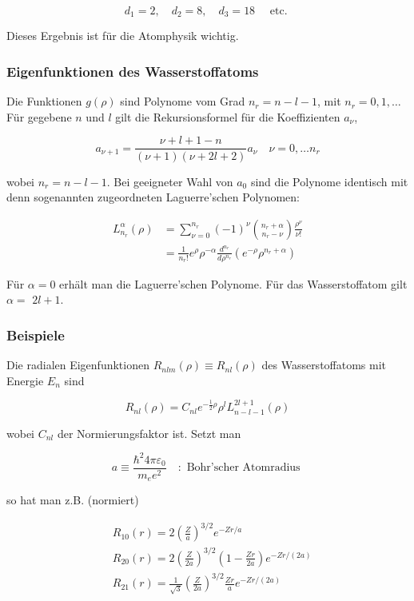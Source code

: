 \documentclass[10pt, letterpaper]{article}
\begin{document}
$$
d_{1}=2, \quad d_{2}=8, \quad d_{3}=18 \quad \text { etc. }
$$

Dieses Ergebnis ist für die Atomphysik wichtig.

\subsubsection*{Eigenfunktionen des Wasserstoffatoms}
Die Funktionen $g(\rho)$ sind Polynome vom Grad $n_{r}=n-l-1$, mit $n_{r}=0,1, \ldots$ Für gegebene $n$ und $l$ gilt die Rekursionsformel für die Koeffizienten $a_{\nu}$,

$$
a_{\nu+1}=\frac{\nu+l+1-n}{(\nu+1)(\nu+2 l+2)} a_{\nu} \quad \nu=0, \ldots n_{r}
$$

wobei $n_{r}=n-l-1$. Bei geeigneter Wahl von $a_{0}$ sind die Polynome identisch mit denn sogenannten zugeordneten Laguerre'schen Polynomen:

$$
\begin{aligned}
L_{n_{r}}^{\alpha}(\rho) & =\sum_{\nu=0}^{n_{r}}(-1)^{\nu}\binom{n_{r}+\alpha}{n_{r}-\nu} \frac{\rho^{\nu}}{\nu!} \\
& =\frac{1}{n_{r}!} e^{\rho} \rho^{-\alpha} \frac{d^{n_{r}}}{d \rho^{n_{r}}}\left(e^{-\rho} \rho^{n_{r}+\alpha}\right)
\end{aligned}
$$

Für $\alpha=0$ erhält man die Laguerre'schen Polynome. Für das Wasserstoffatom gilt $\alpha=$ $2 l+1$.

\subsubsection*{Beispiele}
Die radialen Eigenfunktionen $R_{n l m}(\rho) \equiv R_{n l}(\rho)$ des Wasserstoffatoms mit Energie $E_{n}$ sind

$$
R_{n l}(\rho)=C_{n l} e^{-\frac{1}{2} \rho} \rho^{l} L_{n-l-1}^{2 l+1}(\rho)
$$

wobei $C_{n l}$ der Normierungsfaktor ist. Setzt man

$$
a \equiv \frac{\hbar^{2} 4 \pi \varepsilon_{0}}{m_{e} e^{2}} \quad: \text { Bohr'scher Atomradius }
$$

so hat man z.B. (normiert)

$$
\begin{aligned}
& R_{10}(r)=2\left(\frac{Z}{a}\right)^{3 / 2} e^{-Z r / a} \\
& R_{20}(r)=2\left(\frac{Z}{2 a}\right)^{3 / 2}\left(1-\frac{Z r}{2 a}\right) e^{-Z r /(2 a)} \\
& R_{21}(r)=\frac{1}{\sqrt{3}}\left(\frac{Z}{2 a}\right)^{3 / 2} \frac{Z r}{a} e^{-Z r /(2 a)}
\end{aligned}
$$
\end{document}

